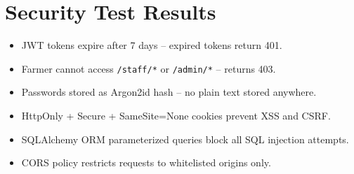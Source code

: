 \section{Security Test Results}
\begin{itemize}
  \item JWT tokens expire after 7 days -- expired tokens return 401.
  \item Farmer cannot access \texttt{/staff/*} or \texttt{/admin/*} -- returns 403.
  \item Passwords stored as Argon2id hash -- no plain text stored anywhere.
  \item HttpOnly + Secure + SameSite=None cookies prevent XSS and CSRF.
  \item SQLAlchemy ORM parameterized queries block all SQL injection attempts.
  \item CORS policy restricts requests to whitelisted origins only.
\end{itemize}
